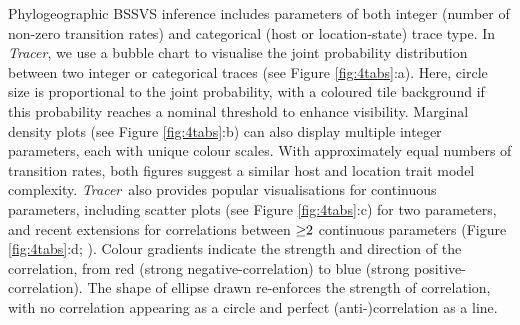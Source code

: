 \documentclass{bioinfo_tracer}
\newcommand{\tracer}{\emph{Tracer}}
\begin{document}
Phylogeographic BSSVS inference includes parameters of both integer (number of non-zero transition rates) and categorical (host or location-state) trace type.
In \tracer, we use a bubble chart to visualise the joint probability distribution between two integer or categorical traces (see Figure \ref{fig:4tabs}:a).
Here, circle size is proportional to the joint probability, %
with a coloured tile background if this probability reaches a nominal threshold to enhance visibility.
Marginal density plots (see Figure \ref{fig:4tabs}:b) can also display multiple integer parameters, each with unique colour scales.
With approximately equal numbers of transition rates, both figures suggest a similar host and location trait model complexity.
\tracer\ also provides
 popular visualisations for continuous parameters, including scatter plots (see Figure \ref{fig:4tabs}:c) for two parameters,
 and recent extensions for correlations between $\ge\hspace{-0.32em}2$ continuous parameters (Figure \ref{fig:4tabs}:d; \citet{Murdoch}).
Colour gradients indicate the strength and direction of the correlation, from red (strong negative-correlation) to blue (strong positive-correlation).
The shape of ellipse drawn re-enforces the strength of correlation, with no correlation appearing as a circle and perfect (anti-)correlation as a line.
\end{document}
